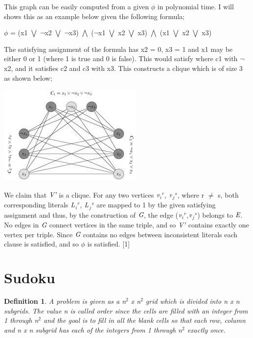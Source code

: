 \documentclass[a4paper]{report}
\newtheorem{defi}{Definition}
\begin{document}
This graph can be easily computed from a given $\phi$ in polynomial time. I will shows this as an example below given the following formula;

\vspace{3mm}
$\phi$ = (x1 $\bigvee$ $\neg$x2 $\bigvee$ $\neg$x3) $\bigwedge$ ($\neg$x1 $\bigvee$ x2 $\bigvee$ x3) $\bigwedge$ (x1 $\bigvee$ x2 $\bigvee$ x3)

\vspace{3mm}
The satisfying assignment of the formula has x2 = 0, x3 = 1 and x1 may be either 0 or 1 (where 1 is true and 0 is false). This would satisfy where c1 with $\neg$x2, and it satisfies c2 and c3 with x3. This constructs a clique which is of size 3 as shown below;

\begin{center}
\includegraphics[scale=0.60]{clique1.png}
\end{center}

We claim that $\emph{V'}$ is a clique. For any two vertices $\emph{v}$$_{i}$$^{r}$, $\emph{v}$$_{j}$$^{s}$, where r $\neq$ s, both corresponding literals $\emph{L}$$_{i}$$^{r}$, $\emph{L}$$_{j}$$^{s}$ are mapped to 1 by the given satisfying assignment and thus, by the construction of $\emph{G}$, the edge ($\emph{v}$$_{i}$$^{r}$,$\emph{v}$$_{j}$$^{s}$) belongs to $\emph{E}$. No edges in $\emph{G}$ connect vertices in the same triple, and so $\emph{V'}$ contains exactly one vertex per triple. Since $\emph{G}$ contains no edges between inconsistent literals each clause is satisfied, and so $\phi$ is satisfied. [1]



\section{Sudoku}

\begin{defi}
A problem is given as a n$^{2}$ x n$^{2}$ grid which is divided into n x n subgrids. The value n is called order since the cells are filled with an integer from 1 through n$^{2}$ and the goal is to fill in all the blank cells so that each row, column and n x n subgrid has each of the integers from 1 through n$^{2}$ exactly once.

\end{defi}
\end{document}
